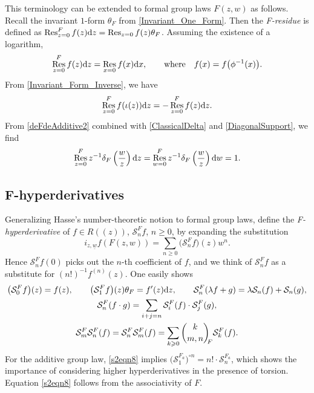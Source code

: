 \documentclass[10pt,a4paper]{amsart}
\numberwithin{equation}{section}
\theoremstyle{definition}
\DeclareMathOperator\Res{Res}
\newcommand\Fbinom[2]{\binom{#1}{#2}_{\!\!F}}
\begin{document}
This terminology can be extended to formal group laws $F(z,w)$ as follows. Recall the invariant $1$-form $\theta_F$ from \eqref{Invariant_One_Form}. Then the \emph{F-residue} is defined as
$
 \Res_{z=0}^F f(z){\rm d}z=\Res_{z=0}f(z)\theta_F$.
Assuming the existence of a logarithm,
\begin{align}
\label{s2eqn5}
 \Res_{z=0}^F f(z){\rm d}z=\Res_{x=0} f(x){\rm d}x,
 \qquad\text{where}\quad f(x)=f\bigl(\phi^{-1}(x)\bigr).
\end{align}
From \eqref{Invariant_Form_Inverse}, we have
\begin{equation}
\label{residue-inversion}
 \Res_{z=0}^F f(\iota(z)){\rm d}z=-\Res_{z=0}^F f(z){\rm d}z.
\end{equation}
From \eqref{deFdeAdditive2} combined with \eqref{ClassicalDelta} and \eqref{DiagonalSupport}, we find
\[
 \Res_{z=0}^Fz^{-1}\delta_F\left(\frac{w}{z}\right){\rm d}z=\Res_{w=0}^Fz^{-1}\delta_F\left(\frac{w}{z}\right){\rm d}w=1.
\]

\subsection[F-hyperderivatives]{$\boldsymbol{F}$-hyperderivatives}
\label{s38}

Generalizing Hasse's number-theoretic notion to formal group laws, define the \emph{F-hyperderivative} of $f\in R(\!( z)\!)$, $\mathcal{S}^F_n f$, $n\geqslant0$, by expanding the substitution
\begin{equation}
\label{def-F-hyper}
 i_{z,\underline{w}}f(F(z,w))=\sum_{n\geqslant0}\bigl(\mathcal{S}^F_n f\bigr)(z)w^n.
\end{equation}
Hence $\mathcal{S}^F_nf(0)$ picks out the $n$-th coefficient of $f$, and we think of $\mathcal{S}^F_n f$ as a substitute for $(n!)^{-1}f^{(n)}(z)$. One easily shows
\begin{gather}%
 \bigl(\mathcal{S}_0^F f\bigr)(z)=f(z),\qquad
 \bigl(\mathcal{S}_1^F f\bigr)(z)\theta_F=f'(z){\rm d}z,\qquad
 \mathcal{S}_n^F(\lambda f+g)=\lambda\mathcal{S}_n(f)+\mathcal{S}_n(g),\nonumber\\
 \mathcal{S}_n^F(f\cdot g)=\sum_{i+j=n} \mathcal{S}_i^F(f)\cdot \mathcal{S}_j^F(g),\label{s2eqn7}\\
 \mathcal{S}_m^F\mathcal{S}_n^F(f)=\mathcal{S}_n^F\mathcal{S}_m^F(f)=\sum_{k\geqslant0}\Fbinom{k}{m,n}\mathcal{S}_k^F(f).\label{s2eqn8}
\end{gather}
For the additive group law, \eqref{s2eqn8} implies $\bigl(\mathcal{S}_1^{F_a}\bigr)^{\circ n}=n!\cdot\mathcal{S}^{F_a}_n$, which shows the importance of considering higher hyperderivatives in the presence of torsion. Equation \eqref{s2eqn8} follows from the associativity of $F$.
\end{document}
